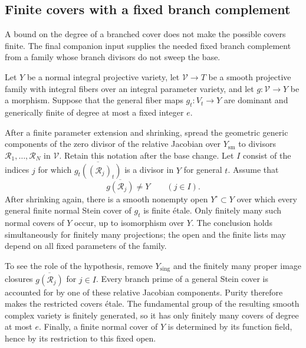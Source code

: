 \subsection{Finite covers with a fixed branch complement}

A bound on the degree of a branched cover does not make the
possible covers finite.  The final companion input supplies the
needed fixed branch complement from a family whose branch
divisors do not sweep the base.

\begin{lemma}
\label{j:finite-covers}
Let $Y$ be a normal integral projective variety, let
$\mathcal V\to T$ be a smooth projective family with integral
fibers over an integral parameter variety, and let
$g:\mathcal V\to Y$ be a morphism.  Suppose that the general
fiber maps $g_t:V_t\to Y$ are dominant and generically finite of
degree at most a fixed integer $e$.

After a finite parameter extension and shrinking, spread the
geometric generic components of the zero divisor of the relative
Jacobian over $Y_{\mathrm{sm}}$ to divisors
$\mathcal R_1,\ldots,\mathcal R_N$ in $\mathcal V$.
Retain this notation after the base change.  Let $I$ consist of
the indices $j$ for which
$\overline{g_t((\mathcal R_j)_t)}$ is a divisor in $Y$ for general
$t$.  Assume that
\[
 \overline{g(\mathcal R_j)}\ne Y\qquad(j\in I).
\]
After shrinking again, there is a smooth nonempty open
$Y^\circ\subset Y$ over which every general finite normal Stein
cover of $g_t$ is finite \'etale.  Only finitely many such normal
covers of $Y$ occur, up to isomorphism over $Y$.
The conclusion holds simultaneously for finitely many
projections; the open and the finite lists may depend on all
fixed parameters of the family.
\end{lemma}

To see the role of the hypothesis, remove $Y_{\mathrm{sing}}$
and the finitely many proper image closures
$\overline{g(\mathcal R_j)}$ for $j\in I$.  Every branch prime
of a general Stein cover is accounted for by one of these
relative Jacobian components.  Purity therefore makes the
restricted covers \'etale.  The fundamental group of the
resulting smooth complex variety is finitely generated, so it
has only finitely many covers of degree at most $e$.  Finally,
a finite normal cover of $Y$ is determined by its function
field, hence by its restriction to this fixed open.
